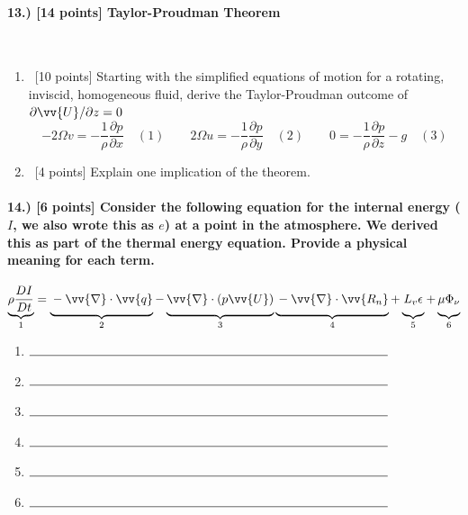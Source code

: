 \documentclass[11pt]{article}
\begin{document}
\paragraph{13.) [14 points] Taylor-Proudman Theorem}~\\
\begin{enumerate}[label=\alph*.)]
\item ~[10 points] Starting with the simplified equations of motion for a rotating, inviscid, homogeneous fluid, derive the Taylor-Proudman outcome of $\partial \vv{U}/\partial z=0$
$$-2\Omega v = -\frac{1}{\rho}\frac{\partial p}{\partial x}\quad (1)\qquad 
		2\Omega u = -\frac{1}{\rho}\frac{\partial p}{\partial y}\quad (2)\qquad
		0 = -\frac{1}{\rho}\frac{\partial p}{\partial z} -g\quad (3)$$
\vspace{300pt}
\item ~[4 points] Explain one implication of the theorem.
\end{enumerate}
\newpage

\paragraph{14.) [6 points] Consider the following equation for the internal energy ($I$, we also wrote this as $e$) at a point in the atmosphere. We derived this as part of the thermal energy equation. Provide a physical meaning for each term.}

$$\underbrace{\rho \frac{DI}{Dt}}_{1} = \underbrace{\vphantom{\frac{DI}{Dt}}-\vv{\nabla}\cdot \vv{q}}_{2} -\underbrace{\vphantom{\frac{DI}{Dt}}\vv{\nabla}\cdot (p\vv{U})}_{3} \underbrace{\vphantom{\frac{DI}{Dt}}-\vv{\nabla}\cdot \vv{R_n}}_{4} + \underbrace{\vphantom{\frac{DI}{Dt}}L_v\epsilon}_{5} + \underbrace{\vphantom{\frac{DI}{Dt}}\mu \Phi_\nu}_{6}$$
\vspace{20pt}
\begin{enumerate}
\item $\rule{10cm}{0.15mm}$
\vspace{10pt}
\item $\rule{10cm}{0.15mm}$
\vspace{10pt}
\item $\rule{10cm}{0.15mm}$
\vspace{10pt}
\item $\rule{10cm}{0.15mm}$
\vspace{10pt}
\item $\rule{10cm}{0.15mm}$
\vspace{10pt}
\item $\rule{10cm}{0.15mm}$
\end{enumerate}
\end{document}
